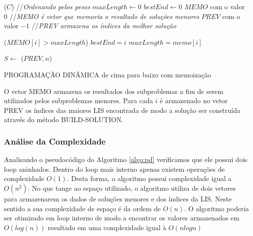 \documentclass[12pt]{article}
\begin{document}
\begin{algorithm}
\DontPrintSemicolon %

\SORT($C$) {//\textit{Ordenando pelos pesos}}\;
$maxLength \gets 0$\;
$bestEnd \gets 0$\;
\INITIALIZE $MEMO$ com o valor $0${ //\textit{MEMO é vetor que memoria o resultado de soluções menores}}\;
\INITIALIZE	$PREV$ com o valor $-1${ //\textit{PREV armazena os índices da melhor solução}}\;
 {
	 {
    
	}
	
	\If ($MEMO[i] > maxLength$) {
			$bestEnd = i$\;
			$maxLength = memo[i]$\;
		}
    
}

$S \gets$ \BUILDSOLUTION($PREV,n$)\;

\;
\caption{\sc PROGRAMAÇÃO DINÂMICA de cima para baixo com memoização}
\label{algo:pd}
\end{algorithm}

O vetor \textsc{MEMO} armazena os resultados dos subproblemas a fim de serem utilizados pelos subproblemas menores. Para cada $i$ é armazenado no vetor \textsc{PREV}{} os índices das maiores LIS encontrada de modo a solução ser construída através do método \textsc{BUILD-SOLUTION}.

\subsubsection{Análise da Complexidade}
\label{subsubsec:analise_pg}

Analisando o pseudocódigo do Algoritmo \ref{algo:pd} verificamos que ele possui dois loop aninhados. Dentro do loop mais interno apenas existem operações de complexidade $O(1)$. Desta forma, o algoritmo possui complexidade igual a $O(n^{2})$. No que tange ao espaço utilizado, o algoritmo utiliza de dois vetores para armazenarem os dados de soluções menores e dos índices da LIS. Neste sentido a sua complexidade de espaço é da ordem de $O(n)$. O algoritmo poderia ser otimizado em loop interno de modo a encontrar os valores armazenados em $O(log(n))$ resultado em uma complexidade igual à $O(nlogn)$
\end{document}
